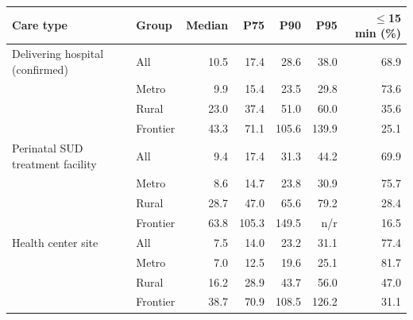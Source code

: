 \begin{tabular}{@{}llrrrrr@{}}
\toprule
Care type & Group & Median & P75 & P90 & P95 & $\le$15 min (\%) \\
\midrule
Delivering hospital (confirmed) & All & 10.5 & 17.4 & 28.6 & 38.0 & 68.9 \\
 & Metro & 9.9 & 15.4 & 23.5 & 29.8 & 73.6 \\
 & Rural & 23.0 & 37.4 & 51.0 & 60.0 & 35.6 \\
 & Frontier & 43.3 & 71.1 & 105.6 & 139.9 & 25.1 \\
\addlinespace
Perinatal SUD treatment facility & All & 9.4 & 17.4 & 31.3 & 44.2 & 69.9 \\
 & Metro & 8.6 & 14.7 & 23.8 & 30.9 & 75.7 \\
 & Rural & 28.7 & 47.0 & 65.6 & 79.2 & 28.4 \\
 & Frontier & 63.8 & 105.3 & 149.5 & n/r & 16.5 \\
\addlinespace
Health center site & All & 7.5 & 14.0 & 23.2 & 31.1 & 77.4 \\
 & Metro & 7.0 & 12.5 & 19.6 & 25.1 & 81.7 \\
 & Rural & 16.2 & 28.9 & 43.7 & 56.0 & 47.0 \\
 & Frontier & 38.7 & 70.9 & 108.5 & 126.2 & 31.1 \\
\bottomrule
\end{tabular}

